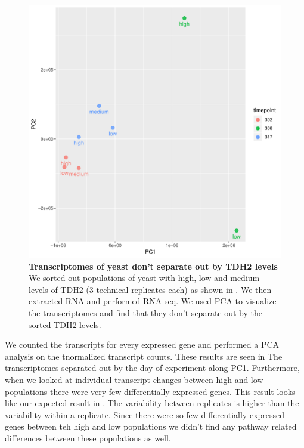 \begin{figure}[t!]  
    \centering
    \includegraphics[width=\linewidth, scale=0.5]{figures/intro/intro_tdh2_clustering_timepoints.pdf}
    \caption[Transcriptomes of yeast don't separate out by TDH2 levels]{%
     	\textbf{Transcriptomes of yeast don't separate out by TDH2 levels}
     	We sorted out populations of yeast with high, low and medium levels of TDH2 (3 technical replicates each) as shown in . We then extracted RNA and performed RNA-seq. We used PCA to visualize the transcriptomes and find that they don't separate out by the sorted TDH2 levels.
    }
    \label{fig:intro5}
\end{figure}

We counted the transcripts for every expressed gene and performed a PCA analysis on the tnormalized transcript counts. These results are seen in  The transcriptomes separated out by the day of experiment along PC1. Furthermore, when we looked at individual transcript changes between high and low populations there were very few differentially expressed genes. This result looks like our expected result in . The variability between replicates is higher than the variability within a replicate. Since there were so few differentially expressed genes between teh high and low populations we didn't find any pathway related differences between these populations as well.

